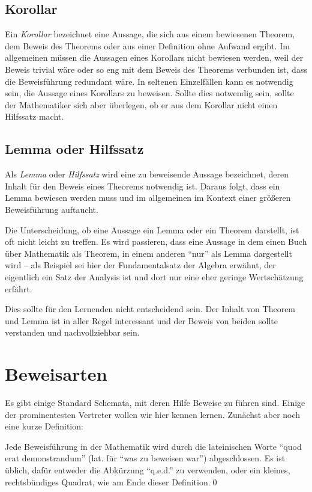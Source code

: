\subsection{Korollar}

Ein \textsl{Korollar} bezeichnet eine Aussage, die sich aus einem bewiesenen Theorem, dem Beweis des Theorems oder aus einer Definition ohne Aufwand ergibt. Im allgemeinen müssen die Aussagen eines Korollars nicht bewiesen werden, weil der Beweis trivial wäre oder so eng mit dem Beweis des Theorems verbunden ist, dass die Beweisführung redundant wäre. In seltenen Einzelfällen kann es notwendig sein, die Aussage eines Korollars zu beweisen. Sollte dies notwendig sein, sollte der Mathematiker sich aber überlegen, ob er aus dem Korollar nicht einen Hilfssatz macht.

\subsection{Lemma oder Hilfssatz}

Als \textsl{Lemma} oder \textsl{Hilfssatz} wird eine zu beweisende Aussage bezeichnet, deren Inhalt für den Beweis eines Theorems notwendig ist. Daraus folgt, dass ein Lemma bewiesen werden muss und im allgemeinen im Kontext einer größeren Beweisführung auftaucht. 

Die Unterscheidung, ob eine Aussage ein Lemma oder ein Theorem darstellt, ist oft nicht leicht zu treffen. Es wird passieren, dass eine Aussage in dem einen Buch über Mathematik als Theorem, in einem anderen "`nur"' als Lemma dargestellt wird -- als Beispiel sei hier der Fundamentalsatz der Algebra erwähnt, der eigentlich ein Satz der Analysis ist und dort nur eine eher geringe Wertschätzung erfährt. 

Dies sollte für den Lernenden nicht entscheidend sein. Der Inhalt von Theorem und Lemma ist in aller Regel interessant und der Beweis von beiden sollte verstanden und nachvollziehbar sein. 

\section{Beweisarten}

Es gibt einige Standard Schemata, mit deren Hilfe Beweise zu führen sind. Einige der prominentesten Vertreter wollen wir hier kennen lernen. Zunächst aber noch eine kurze Definition:
\begin{definition}
Jede Beweisführung in der Mathematik wird durch die lateinischen Worte "`quod erat demonstrandum"' (lat. für "`was zu beweisen war"') abgeschlossen. Es ist üblich, dafür entweder die Abkürzung "`q.e.d."' zu verwenden, oder ein kleines, rechtsbündiges Quadrat, wie am Ende dieser Definition.\qed
\end{definition}

